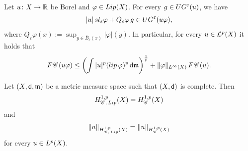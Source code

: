 \documentclass[10pt,a4paper]{amsart}
\newcommand{\Chain}[1]{\mathscr{C}^{#1}}
\newcommand{\F}{{\rm F}}
\newcommand{\HH}[2]{H^{1,#1}_{{\rm #2}}}
\newcommand{\Lip}{{\rm Lip}}
\newcommand{\R}{\mathbb{R}}
\newcommand{\X}{{\rm X}}
\newcommand{\lip}{{\rm lip}}
\newcommand{\mm}{\mathfrak m}
\newcommand{\sfd}{{\sf d}}
\renewcommand{\d}{{\mathrm d}}
\begin{document}
\begin{proposition}
\label{prop:Leibniz-rule-chains}
    Let $u\colon \X \to \R$ be Borel and $\varphi \in {\rm Lip}(\X)$.
    For every $g \in {\rm UG}^\varepsilon(u)$, we have
    \begin{equation}
    \label{eq:varepsilon_upper_gradient_Leibniz}
        \vert u \vert\, {\rm sl}_\varepsilon \varphi + Q_\varepsilon \varphi\, g \in {\rm UG}^\varepsilon(u \varphi),
    \end{equation}
    where $Q_\varepsilon\varphi(x):= \sup_{y\in \overline{B}_\varepsilon(x)} \vert \varphi \vert(y)$. In particular, for every $u \in \mathcal{L}^p(\X)$ it holds that
    \begin{equation}
    \label{eq:Leibniz_rule}
        \F{\Chain{}}(u\varphi) \le \left( \int |u|^p (\lip\,\varphi)^p \,\d \mm \right)^{\frac{1}{p}} + \|\varphi\|_{L^\infty(\X)}\, \F{\Chain{}}(u).
    \end{equation}

    
\end{proposition}

\begin{theorem}
    \label{theo:density-energy-chains-complete}
    Let $(\X,\sfd,\mm)$ be a metric measure space such that $(\X,\sfd)$ is complete. Then 
    \begin{equation}
        \HH{p}{\Chain{},\, \Lip}(\X) = \HH{p}{\Chain{}}(\X)
    \end{equation}
    and
    \begin{equation}
        \|u \|_{\HH{p}{\Chain{},\, \Lip}(\X)}  = \|u \|_{\HH{p}{\Chain{}}(\X)}
    \end{equation}
    for every $u\in L^p(\X)$.
\end{theorem}
\end{document}
